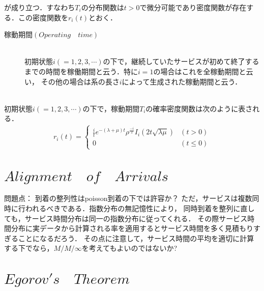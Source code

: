 \documentclass[a4j,papersize,disablejfam,slide,14pt]{jsarticle}
\def\exp#1{e^{#1}} %
\begin{document}
    が成り立つ．すなわち$T_i$の分布関数は$t>0$で微分可能であり密度関数が存在する．この密度関数を$r_i(t)$とおく．
    \begin{screen}
    	\begin{description}
        	\item[稼動期間$(Operating\quad time)$]\mbox{}\\
            	初期状態$i (= 1,2,3,\cdots)$の下で，継続していたサービスが初めて終了するまでの時間を稼働期間と云う．特に$i=1$の場合はこれを全稼動期間と云い，
                その他の場合は系の長さ$i$によって生成された稼動期間と云う．
        \end{description}
        \mbox{}\\
    	初期状態$i (= 1,2,3,\cdots)$の下で，稼動期間$T_i$の確率密度関数は次のように表される．
    	\begin{align}
        	r_i(t) =
            \begin{cases}	
            	\frac{i}{t} \exp{-(\lambda + \mu)t} \rho^{\frac{-i}{2}} I_{i}(2t\sqrt{\lambda \mu}) & (t > 0) \\
                0 & (t \leq 0)
            \end{cases}
        \end{align}
    \end{screen}

\section{$Alignment\quad of\quad Arrivals$}
	問題点：
	到着の整列性はpoisson到着の下では許容か？
    ただ，サービスは複数同時に行われるべきである．指数分布の無記憶性により，
    同時到着を整列に直しても，サービス時間分布は同一の指数分布に従ってくれる．
    その際サービス時間分布に実データから計算される率を適用するとサービス時間を多く見積もりすぎることになるだろう．
    その点に注意して，サービス時間の平均を適切に計算する下でなら，$M/M/\infty$を考えてもよいのではないか?


\appendix
\def\thesection{A-\arabic{section}}
\section{$Egorov's\quad Theorem$}
\end{document}
